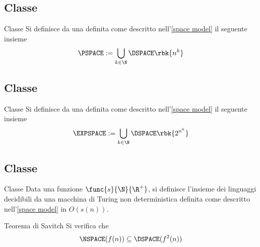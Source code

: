 \documentclass[a4paper, 12pt]{report}
\begin{document}
    \subsection{Classe \PSPACE}

    \begin{frameddefn}{Classe \PSPACE}
        Si definisce  da una \TM definita come descritto nell'\cref{space model} il seguente insieme $$\PSPACE := \displaystyle \bigcup_{k \in \N}{\DSPACE \rbk{n^k}}$$
    \end{frameddefn}

    \subsection{Classe \EXPSPACE}

    \begin{frameddefn}{Classe \EXPSPACE}
        Si definisce  da una \TM definita come descritto nell'\cref{space model} il seguente insieme $$\EXPSPACE := \displaystyle \bigcup_{k \in \N}{\DSPACE \rbk{2^{n^k}}}$$
    \end{frameddefn}

    \subsection{Classe \NSPACE}
    
    \begin{frameddefn}{Classe \NSPACE}
        Data una funzione $\func{s}{\N}{\R^+}$, si definisce  l'insieme dei linguaggi decidibili da una macchina di Turing non deterministica definita come descritto nell'\cref{space model} in $O(s(n))$.
    \end{frameddefn}

    \begin{framedthm}[label={savitch}]{Teorema di Savitch}
        Si verifica che $$\NSPACE(f(n)) \subseteq \DSPACE(f^2(n))$$
    \end{framedthm}
\end{document}
